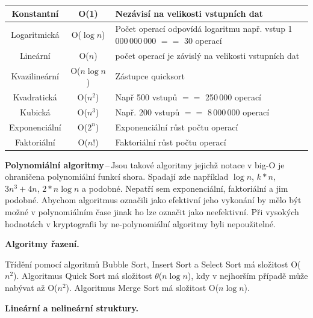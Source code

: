 \begin{table}[h]
    \begin{tabularx}{\textwidth}{|c|c|X|}\hline
        Konstantní & O(1) & Nezávisí na velikosti vstupních dat\\\hline
        Logaritmická & O($\log{n}$) & Počet operací odpovídá logaritmu např. vstup 1\,000\,000\,000 $==$ 30 operací\\\hline
        Lineární & O($n$)& počet operací je závislý na velikosti vstupních dat\\\hline
        Kvazilineární& O($n\log{n}$)& Zástupce quicksort\\\hline
        Kvadratická& O($n^2$)& Např 500 vstupů $==$ 250\,000 operací\\\hline
        Kubická & O($n^3$)& Např. 200 vstupů $==$ 8\,000\,000 operací\\\hline
        Exponenciální&O($2^n$)& Exponenciální růst počtu operací\\\hline
        Faktoriální&O($n!$)& Faktoriální růst počtu operací\\\hline
    \end{tabularx}
\end{table}

\textbf{Polynomiální algoritmy}\,--\,Jsou takové algoritmy jejichž notace v big-O je ohraničena polynomiální funkcí shora. Spadají zde například $\log{n}$, $k*n$, $3n^3 + 4n$, $2*n\log{n}$ a podobné. Nepatří sem exponenciální, faktoriální a jim podobné. Abychom algoritmus označili jako efektivní jeho vykonání by mělo být možné v polynomiálním čase jinak ho lze označit jako neefektivní. Při vysokých hodnotách v kryptografii by ne-polynomiální algoritmy byli nepoužitelné.

\begin{Large}\vspace{0,5cm} \textbf{Algoritmy řazení.}
\end{Large}

Třídění pomocí algoritmů Bubble Sort, Insert Sort a Select Sort má složitost O($n^2$). Algoritmus Quick Sort má složitost $\theta$($n\log{n}$), kdy v nejhorším případě může nabývat až O($n^2$). Algoritmus Merge Sort má složitost O($n\log{n}$).

\vspace{1cm}
\begin{Large}\vspace{0,5cm} \textbf{Lineární a nelineární struktury.}
\end{Large}

